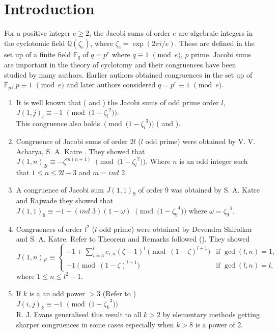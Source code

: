 \documentclass[a4paper,12pt]{article}
\def\F{{\mathbb F}}
\def\Q{{\mathbb Q}}                               %
\def\vpmod{\!\!\!\pmod}
\begin{document}
\section{Introduction} \label{sec:Intr}

For a positive integer $e \geq 2$, the Jacobi sums of order $e$ are algebraic integers in the cyclotomic field $\Q(\zeta_{e})$, where $\zeta_{e} = \exp(2\pi i/e)$. 
These are defined in the set up of a finite field $\F_{q}$ of $q =p^{r}$ where $q \equiv 1\,\, \vpmod{e}$, $p$ prime. 
Jacobi sums are important in the theory of cyclotomy and their congruences have been studied by many authors.
Earlier authors \cite{2} obtained congruences in the set up of $\F_{p}$, $p\equiv 1\,\, \vpmod{e}$  and later authors \cite{5} considered $q = p^r \equiv 1\,\, \vpmod{e}$.
\begin{enumerate}
\item It is well known that (\cite{2} and \cite{13}) the Jacobi sums of odd prime order $l$, 
$J(1,j)_{l}\equiv -1\,\,\vpmod{(1-\zeta_{l}}^2)$.\\ This congruence also holds $\vpmod{(1-\zeta_{l}}^3)$ (\cite{7} and \cite{14}).
\item Congruence of Jacobi sums of order $2l$ ($l$ odd prime) were obtained by V. V. Acharya, S. A. Katre \cite{1}. 
They showed that\\ $J(1,n)_{2l}\equiv -\zeta^{m(n+1)}\,\, \vpmod{(1-\zeta_{l}}^2)$. Where $n$ is an odd integer such that $1\leq n\leq 2l-3$ and $m= ind\,\, 2$.
\item A congruence of Jacobi sum $J(1,1)_{9}$ of order 9 was obtained by S.  A.  Katre and Rajwade \cite{8} they showed that\\
$J(1,1)_{9}\equiv -1-(ind\,\, 3)(1-\omega)\,\,\vpmod{(1-\zeta_{9}}^4)$ where $\omega={\zeta_{9}}^3$.
\item Congruences of order $l^2$ ($l$ odd prime) were obtained by Devendra Shirolkar and S. A. Katre. 
Refer to Theorem and Remarks followed (\cite{15}). They showed\\
\begin{equation*}
J(1,n)_{l^2} \equiv 
\begin{cases}
-1 + \displaystyle{\sum_{i=3}^{l}c_{i,n}(\zeta -1)^i} \vpmod{(1-\zeta)^{l + 1}} & \text{if $\gcd (l,n) =1$,}\\
-1  \vpmod{(1-\zeta)^{l + 1}} &\text{if $\gcd (l,n) = l$,}
\end{cases}
\end{equation*}
where $1\leq n\leq l^{2}-1$.
\item If $k$ is a an odd power $>3$ (Refer to \cite{6})\\
$J(i,j)_{k}\equiv -1\,\, \vpmod{(1-\zeta_{k}}^3)$\\
R. J. Evans \cite{5} generalised this result to all $k>2$ by elementary methods getting sharper congruences in some cases especially when $k>8$ is a power of 2.
\end{enumerate}
\end{document}
